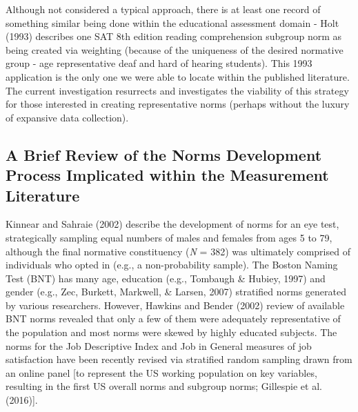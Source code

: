 \documentclass[
  ,man]{apa6}
\begin{document}
Although not considered a typical approach, there is at least one record of something similar being done within the educational assessment domain - Holt (1993) describes one SAT 8th edition reading comprehension subgroup norm as being created via weighting (because of the uniqueness of the desired normative group - age representative deaf and hard of hearing students). This 1993 application is the only one we were able to locate within the published literature. The current investigation resurrects and investigates the viability of this strategy for those interested in creating representative norms (perhaps without the luxury of expansive data collection).

\hypertarget{a-brief-review-of-the-norms-development-process-implicated-within-the-measurement-literature}{%
\subsection{A Brief Review of the Norms Development Process Implicated within the Measurement Literature}\label{a-brief-review-of-the-norms-development-process-implicated-within-the-measurement-literature}}

Kinnear and Sahraie (2002) describe the development of norms for an eye test, strategically sampling equal numbers of males and females from ages 5 to 79, although the final normative constituency (\emph{N} = 382) was ultimately comprised of individuals who opted in (e.g., a non-probability sample). The Boston Naming Test (BNT) has many age, education (e.g., Tombaugh \& Hubiey, 1997) and gender (e.g., Zec, Burkett, Markwell, \& Larsen, 2007) stratified norms generated by various researchers. However, Hawkins and Bender (2002) review of available BNT norms revealed that only a few of them were adequately representative of the population and most norms were skewed by highly educated subjects. The norms for the Job Descriptive Index and Job in General measures of job satisfaction have been recently revised via stratified random sampling drawn from an online panel {[}to represent the US working population on key variables, resulting in the first US overall norms and subgroup norms; Gillespie et al. (2016){]}.
\end{document}
